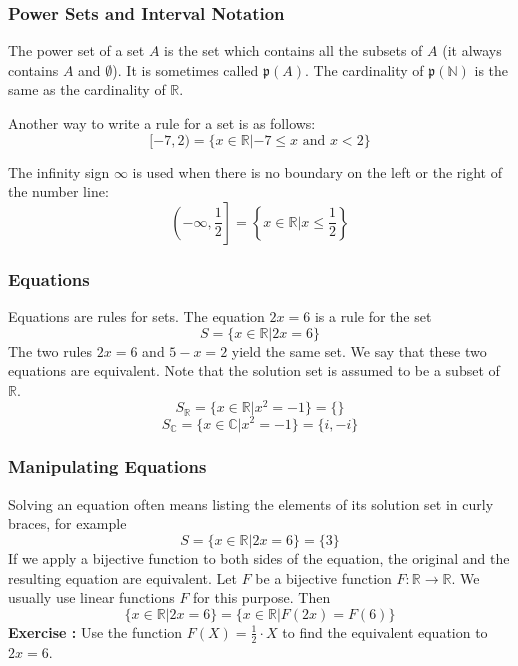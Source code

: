 \documentclass[xcolor=dvipsnames]{beamer}
\newcounter{exercise}
\newcommand{\ubung}[0]{\refstepcounter{exercise}\textbf{Exercise \arabic{exercise}: }}
\begin{document}
\begin{frame}
  \frametitle{Power Sets and Interval Notation}
  The \alert{power set} of a set $A$ is the set which contains all the
  subsets of $A$ (it always contains $A$ and $\emptyset$). It is
  sometimes called $\mathfrak{p}(A)$. The cardinality of
  $\mathfrak{p}(\mathbb{N})$ is the same as the cardinality of
  $\mathbb{R}$.

  Another way to write a rule for a set is as follows:
  \begin{equation}
    \label{eq:oosaeshu}
    [-7,2)=\{x\in\mathbb{R}|-7\leq{}x\mbox{ and }x<2\}
  \end{equation}

  The infinity sign $\infty$ is used when there is no boundary on the
  left or the right of the number line:
  \begin{equation}
    \label{eq:susheipe}
    \left.\left(-\infty,\frac{1}{2}\right.\right]=\left\{x\in\mathbb{R}|x\leq\frac{1}{2}\right\}
  \end{equation}
\end{frame}

\begin{frame}
  \frametitle{Equations}
  Equations are rules for sets. The equation $2x=6$ is a rule for the set
  \begin{equation}
    \label{eq:vaechohd}
    S=\{x\in\mathbb{R}|2x=6\}
  \end{equation}
  The two rules $2x=6$ and $5-x=2$ yield the same set. We say that
  these two equations are \alert{equivalent}. Note that the solution
  set is assumed to be a subset of $\mathbb{R}$.
  \begin{equation}
    \label{eq:xeedoogh}
    S_{\mathbb{R}}=\{x\in\mathbb{R}|x^{2}=-1\}=\{\}
  \end{equation}
  \begin{equation}
    \label{eq:aidietha}
    S_{\mathbb{C}}=\{x\in\mathbb{C}|x^{2}=-1\}=\{i,-i\}
  \end{equation}
\end{frame}

\begin{frame}
  \frametitle{Manipulating Equations}
  Solving an equation often means listing the elements of its
  \alert{solution set} in curly
  braces, for example
  \begin{equation}
    \label{eq:ohnomoow}
    S=\{x\in\mathbb{R}|2x=6\}=\{3\}
  \end{equation}
If we apply a bijective function to both sides of the equation, the
original and the resulting equation are equivalent. Let $F$ be a
bijective function $F:\mathbb{R}\rightarrow\mathbb{R}$. We usually use
linear functions $F$ for this purpose. Then
\begin{equation}
  \label{eq:iikucire}
  \{x\in\mathbb{R}|2x=6\}=\{x\in\mathbb{R}|F(2x)=F(6)\}
\end{equation}
{\ubung} Use the function $F(X)=\frac{1}{2}\cdot{}X$ to find the equivalent
equation to $2x=6$.
\end{frame}
\end{document}

